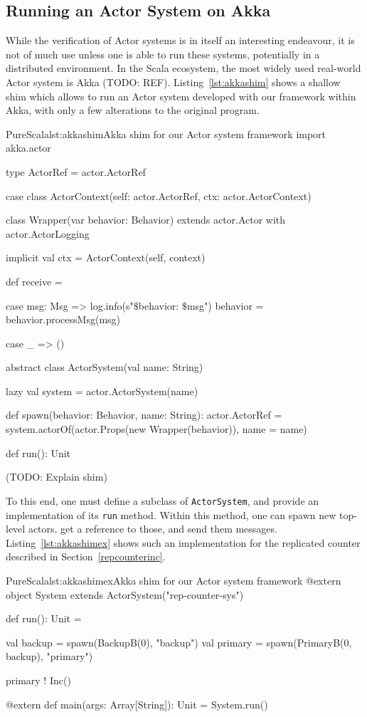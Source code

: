 \documentclass[a4paper,twoside]{article}
\newcommand{\TODO}[1]{\textcolor{YellowOrange}{(TODO: #1)}} %
\newcommand{\RefSec}[1]{Section~\ref{#1}}
\newcommand{\RefCode}[1]{Listing~\ref{#1}}
\newcommand{\stt}[1]{\texttt{\small{#1}}}
\begin{document}
\subsection{Running an Actor System on Akka}
\label{akka}

While the verification of Actor systems is in itself an interesting endeavour, it is not of much use unless one is able to run these systems, potentially in a distributed environment. In the Scala ecosystem, the most widely used real-world Actor system is Akka \TODO{REF}. \RefCode{lst:akkashim} shows a shallow shim which allows to run an Actor system developed with our framework within Akka, with only a few alterations to the original program.

\begin{Code}{PureScala}{lst:akkashim}{Akka shim for our Actor system framework}
import akka.actor

type ActorRef = actor.ActorRef

case class ActorContext(self: actor.ActorRef, ctx: actor.ActorContext)

class Wrapper(var behavior: Behavior)
  extends actor.Actor with actor.ActorLogging {

  implicit val ctx = ActorContext(self, context)

  def receive = {
    case msg: Msg =>
      log.info(s"$\$${behavior}: $\$${msg}")
      behavior = behavior.processMsg(msg)

    case _ => ()
  }
}

abstract class ActorSystem(val name: String) {
  lazy val system = actor.ActorSystem(name)

  def spawn(behavior: Behavior, name: String): actor.ActorRef = {
    system.actorOf(actor.Props(new Wrapper(behavior)), name = name)
  }

  def run(): Unit
}
\end{Code}

\TODO{Explain shim}

To this end, one must define a subclass of \stt{ActorSystem}, and provide an implementation of its \stt{run} method. Within this method, one can spawn new top-level actors, get a reference to those, and send them messages. \RefCode{lst:akkashimex} shows such an implementation for the replicated counter described in \RefSec{repcounterinc}. 

\begin{Code}{PureScala}{lst:akkashimex}{Akka shim for our Actor system framework}
@extern
object System extends ActorSystem("rep-counter-sys") {
  def run(): Unit = {
    val backup  = spawn(BackupB(0), "backup")
    val primary = spawn(PrimaryB(0, backup), "primary")

    primary ! Inc()
  }
}

@extern
def main(args: Array[String]): Unit = {
  System.run()
}
\end{Code}
\end{document}
